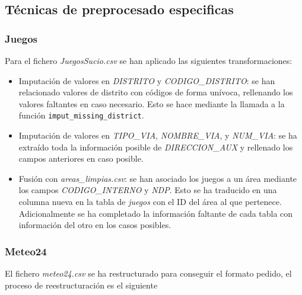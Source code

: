 \documentclass[]{article}
\begin{document}
\subsection{Técnicas de preprocesado especificas}
\label{subsec:preprocessespecifico}

\subsubsection{Juegos}
\label{subsubsec:preprocessjuego}
Para el fichero \textit{JuegosSucio.csv} se han aplicado las siguientes transformaciones:

\begin{itemize}
    \item Imputación de valores en \textit{DISTRITO} y \textit{CODIGO\_DISTRITO}: se han relacionado valores de distrito con códigos de forma unívoca, rellenando los valores faltantes en caso necesario. Esto se hace mediante la llamada a la función \texttt{imput\_missing\_district}.
    \item Imputación de valores en \textit{TIPO\_VIA}, \textit{NOMBRE\_VIA}, y \textit{NUM\_VIA}: se ha extraído toda la información posible de \textit{DIRECCION\_AUX} y rellenado los campos anteriores en caso posible.
    \item Fusión con \textit{areas\_limpias.csv}: se han asociado los juegos a un área mediante los campos \textit{CODIGO\_INTERNO} y \textit{NDP}. Esto se ha traducido en una columna nueva en la tabla de \textit{juegos} con el ID del área al que pertenece. Adicionalmente se ha completado la información faltante de cada tabla con información del otro en los casos posibles.
\end{itemize}

\subsubsection{Meteo24}
\label{subsubsec:preprocessmeteo}
El fichero \textit{meteo24.csv} se ha restructurado para conseguir el formato pedido, el proceso de reestructuración es el siguiente
\end{document}
